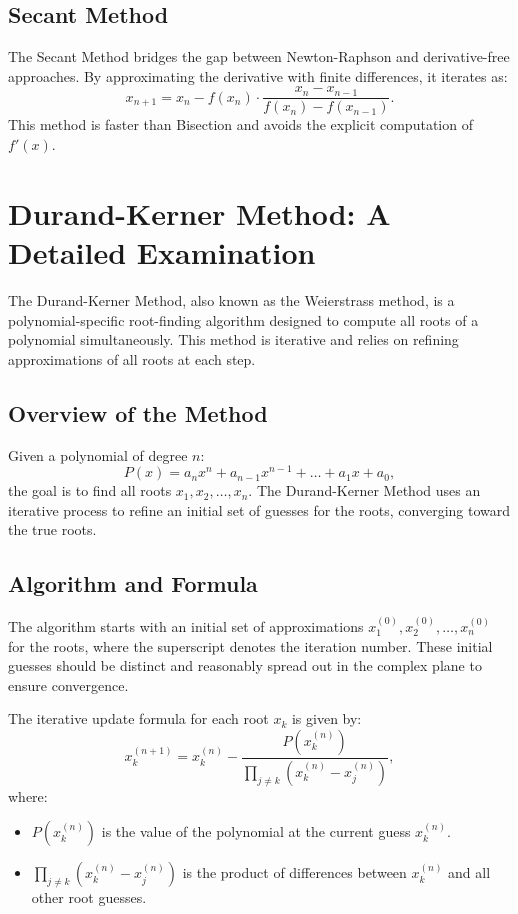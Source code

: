 \documentclass[10pt]{IEEEtran}
\begin{document}
\subsection{Secant Method}
The Secant Method bridges the gap between Newton-Raphson and derivative-free approaches. By approximating the derivative with finite differences, it iterates as:
\begin{equation}
    x_{n+1} = x_n - f(x_n) \cdot \frac{x_n - x_{n-1}}{f(x_n) - f(x_{n-1})}.
\end{equation}
This method is faster than Bisection and avoids the explicit computation of $f'(x)$\cite{NumericalRootFindingAlgorithms2024}.

\section{Durand-Kerner Method: A Detailed Examination}
The Durand-Kerner Method, also known as the Weierstrass method, is a polynomial-specific root-finding algorithm designed to compute all roots of a polynomial simultaneously. This method is iterative and relies on refining approximations of all roots at each step. 

\subsection{Overview of the Method}
Given a polynomial of degree $n$:
\begin{equation}
    P(x) = a_n x^n + a_{n-1} x^{n-1} + \dots + a_1 x + a_0,
\end{equation}
the goal is to find all roots $x_1, x_2, \dots, x_n$. The Durand-Kerner Method uses an iterative process to refine an initial set of guesses for the roots, converging toward the true roots.

\subsection{Algorithm and Formula}
The algorithm starts with an initial set of approximations $x_1^{(0)}, x_2^{(0)}, \dots, x_n^{(0)}$ for the roots, where the superscript denotes the iteration number. These initial guesses should be distinct and reasonably spread out in the complex plane to ensure convergence.

The iterative update formula for each root $x_k$ is given by:
\begin{equation}
    x_k^{(n+1)} = x_k^{(n)} - \frac{P(x_k^{(n)})}{\prod_{j \neq k} (x_k^{(n)} - x_j^{(n)})},
\end{equation}
where:
\begin{itemize}
    \item $P(x_k^{(n)})$ is the value of the polynomial at the current guess $x_k^{(n)}$.
    \item $\prod_{j \neq k} (x_k^{(n)} - x_j^{(n)})$ is the product of differences between $x_k^{(n)}$ and all other root guesses.
\end{itemize}
\end{document}
